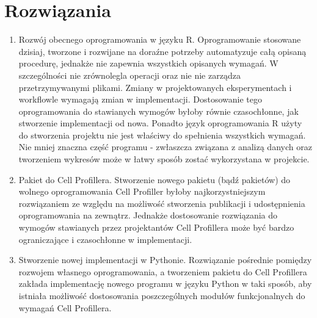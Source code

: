 \section{Rozwiązania}

\begin{enumerate}
\item Rozwój obecnego oprogramowania w języku R. Oprogramowanie stosowane dzisiaj, tworzone i rozwijane na doraźne potrzeby automatyzuje całą opisaną procedurę, jednakże nie zapewnia wszystkich opisanych wymagań. W szczególności nie zrównolegla operacji oraz nie nie zarządza przetrzymywanymi plikami. Zmiany w projektowanych eksperymentach i workflowle wymagają zmian w implementacji.
Dostosowanie tego oprogramowania do stawianych wymogów byłoby równie czasochłonne, jak stworzenie implementacji od nowa. 
Ponadto język oprogramowania R użyty do stworzenia projektu nie jest właściwy do spełnienia wszystkich wymagań.
Nie mniej znaczna część programu - zwłaszcza związana z analizą danych oraz tworzeniem wykresów może w łatwy sposób zostać wykorzystana w projekcie.


\item Pakiet do Cell Profillera. Stworzenie nowego pakietu (bądź pakietów) do wolnego oprogramowania Cell Profiller byłoby najkorzystniejszym rozwiązaniem ze względu na możliwość stworzenia publikacji i udostępnienia oprogramowania na zewnątrz. Jednakże dostosowanie rozwiązania do wymogów stawianych przez projektantów Cell Profillera może być bardzo ograniczające i czasochłonne w implementacji.

\item Stworzenie nowej implementacji w Pythonie. 
Rozwiązanie pośrednie pomiędzy rozwojem własnego oprogramowania, a tworzeniem pakietu do Cell Profillera zakłada implementację nowego programu w języku Python w taki sposób, aby istniała możliwość dostosowania poszczególnych modułów funkcjonalnych do wymagań Cell Profillera. 
\end{enumerate}